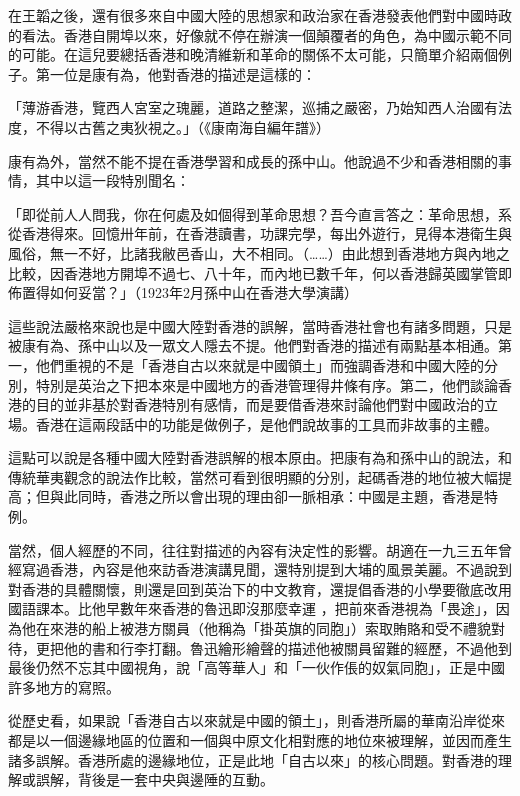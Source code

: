 在王韜之後，還有很多來自中國大陸的思想家和政治家在香港發表他們對中國時政的看法。香港自開埠以來，好像就不停在辦演一個顛覆者的角色，為中國示範不同的可能。在這兒要總括香港和晚清維新和革命的關係不太可能，只簡單介紹兩個例子。第一位是康有為，他對香港的描述是這樣的：

\begin{displayquote}
    「薄游香港，覽西人宮室之瑰麗，道路之整潔，巡捕之嚴密，乃始知西人治國有法度，不得以古舊之夷狄視之。」（《康南海自編年譜》）
\end{displayquote}

康有為外，當然不能不提在香港學習和成長的孫中山。他說過不少和香港相關的事情，其中以這一段特別聞名：

\begin{displayquote}
    「即從前人人問我，你在何處及如個得到革命思想？吾今直言答之：革命思想，系從香港得來。回憶卅年前，在香港讀書，功課完學，每出外遊行，見得本港衛生與風俗，無一不好，比諸我敝邑香山，大不相同。（……）由此想到香港地方與內地之比較，因香港地方開埠不過七、八十年，而內地已數千年，何以香港歸英國掌管即佈置得如何妥當？」（1923年2月孫中山在香港大學演講）
\end{displayquote}

這些說法嚴格來說也是中國大陸對香港的誤解，當時香港社會也有諸多問題，只是被康有為、孫中山以及一眾文人隱去不提。他們對香港的描述有兩點基本相通。第一，他們重視的不是「香港自古以來就是中國領土」而強調香港和中國大陸的分別，特別是英治之下把本來是中國地方的香港管理得井條有序。第二，他們談論香港的目的並非基於對香港特別有感情，而是要借香港來討論他們對中國政治的立場。香港在這兩段話中的功能是做例子，是他們說故事的工具而非故事的主體。

這點可以說是各種中國大陸對香港誤解的根本原由。把康有為和孫中山的說法，和傳統華夷觀念的說法作比較，當然可看到很明顯的分別，起碼香港的地位被大幅提高；但與此同時，香港之所以會出現的理由卻一脈相承：中國是主題，香港是特例。

當然，個人經歷的不同，往往對描述的內容有決定性的影響。胡適在一九三五年曾經寫過香港，內容是他來訪香港演講見聞，還特別提到大埔的風景美麗。不過說到對香港的具體關懷，則還是回到英治下的中文教育，還提倡香港的小學要徹底改用國語課本。比他早數年來香港的魯迅即沒那麼幸運 ，把前來香港視為「畏途」，因為他在來港的船上被港方關員（他稱為「掛英旗的同胞」）索取賄賂和受不禮貌對待，更把他的書和行李打翻。魯迅繪形繪聲的描述他被關員留難的經歷，不過他到最後仍然不忘其中國視角，說「高等華人」和「一伙作倀的奴氣同胞」，正是中國許多地方的寫照。

從歷史看，如果說「香港自古以來就是中國的領土」，則香港所屬的華南沿岸從來都是以一個邊緣地區的位置和一個與中原文化相對應的地位來被理解，並因而產生諸多誤解。香港所處的邊緣地位，正是此地「自古以來」的核心問題。對香港的理解或誤解，背後是一套中央與邊陲的互動。

